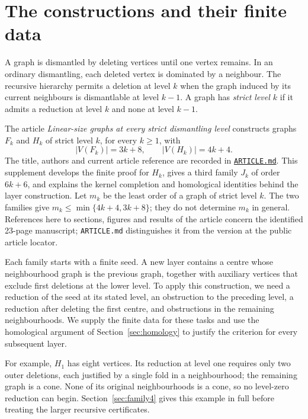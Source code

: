 \section{The constructions and their finite data}
A graph is dismantled by deleting vertices until one vertex remains. In an
ordinary dismantling, each deleted vertex is dominated by a neighbour. The
recursive hierarchy permits a deletion at level $k$ when the graph induced by
its current neighbours is dismantlable at level $k-1$. A graph has
\emph{strict level $k$} if it admits a reduction at level $k$ and none at level
$k-1$.

The article \emph{Linear-size graphs at every strict dismantling level}
constructs graphs $F_k$ and $H_k$ of strict level $k$, for every $k\geq1$,
with
\[
 |V(F_k)|=3k+8,\qquad |V(H_k)|=4k+4.
\]
The title, authors and current article reference are recorded in
\href{https://github.com/Geometric-and-Combinatorial-Structures/strictly-k-dismantlable-graphs/blob/v1.1.1/ARTICLE.md}{\texttt{ARTICLE.md}}.
This supplement develops the finite proof for $H_k$, gives a third family
$J_k$ of order $6k+6$, and explains the kernel completion and homological
identities behind the layer construction. Let $m_k$ be the least order
of a graph of strict level $k$. The two families give
$m_k\leq\min\{4k+4,3k+8\}$; they do not determine $m_k$ in general.
References here to sections, figures and results of the article concern the
identified 23-page manuscript; \texttt{ARTICLE.md} distinguishes it from
the version at the public article locator.

Each family starts with a finite seed. A new layer contains a centre whose
neighbourhood graph is the previous graph, together with auxiliary vertices
that exclude first deletions at the lower level. To apply this construction,
we need a reduction of the seed at its stated level, an obstruction to the
preceding level, a reduction after deleting the first centre, and obstructions
in the remaining neighbourhoods. We supply the finite data for these tasks
and use the homological argument of Section~\ref{sec:homology} to justify the
criterion for every subsequent layer.

For example, $H_1$ has eight vertices. Its reduction at level one requires
only two outer deletions, each justified by a single fold in a neighbourhood;
the remaining graph is a cone. None of its original neighbourhoods is a cone,
so no level-zero reduction can begin. Section~\ref{sec:family4} gives this
example in full before treating the larger recursive certificates.

